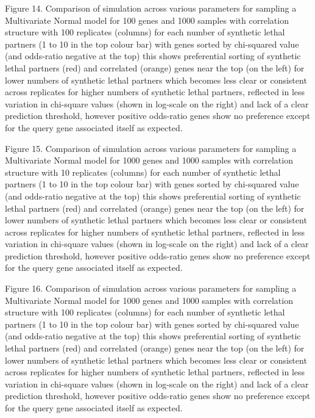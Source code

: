 Figure 14.  Comparison of simulation across various parameters for sampling a Multivariate Normal model for 100 genes and 1000 samples with correlation structure with 100 replicates (columns) for each number of synthetic lethal partners (1 to 10 in the top colour bar) with genes sorted by chi-squared value (and odds-ratio negative at the top) this shows preferential sorting of synthetic lethal partners (red) and correlated (orange) genes near the top (on the left) for lower numbers of synthetic lethal partners which becomes less clear or consistent across replicates for higher numbers of synthetic lethal partners, reflected in less variation in chi-square values (shown in log-scale on the right) and lack of a clear prediction threshold, however positive odds-ratio genes show no preference except for the query gene associated itself as expected.  
   
Figure 15.  Comparison of simulation across various parameters for sampling a Multivariate Normal model for 1000 genes and 1000 samples with correlation structure with 10 replicates (columns) for each number of synthetic lethal partners (1 to 10 in the top colour bar) with genes sorted by chi-squared value (and odds-ratio negative at the top) this shows preferential sorting of synthetic lethal partners (red) and correlated (orange) genes near the top (on the left) for lower numbers of synthetic lethal partners which becomes less clear or consistent across replicates for higher numbers of synthetic lethal partners, reflected in less variation in chi-square values (shown in log-scale on the right) and lack of a clear prediction threshold, however positive odds-ratio genes show no preference except for the query gene associated itself as expected.
    
Figure 16.  Comparison of simulation across various parameters for sampling a Multivariate Normal model for 1000 genes and 1000 samples with correlation structure with 100 replicates (columns) for each number of synthetic lethal partners (1 to 10 in the top colour bar) with genes sorted by chi-squared value (and odds-ratio negative at the top) this shows preferential sorting of synthetic lethal partners (red) and correlated (orange) genes near the top (on the left) for lower numbers of synthetic lethal partners which becomes less clear or consistent across replicates for higher numbers of synthetic lethal partners, reflected in less variation in chi-square values (shown in log-scale on the right) and lack of a clear prediction threshold, however positive odds-ratio genes show no preference except for the query gene associated itself as expected.
\fi